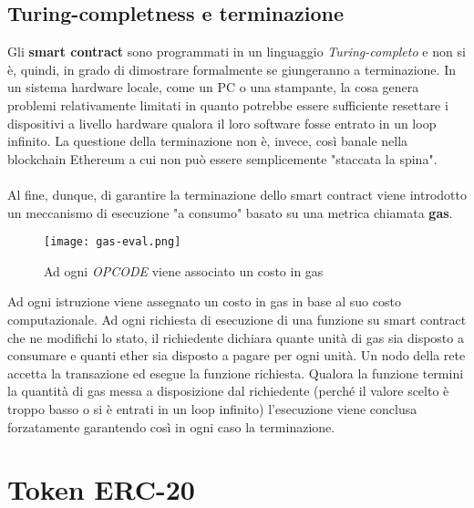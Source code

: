     \subsection{Turing-completness e terminazione}
    \label{contesto:ethereum:terminazione}
    Gli \textbf{smart contract} sono programmati in un linguaggio \textit{Turing-completo} e non si è, quindi, in grado di dimostrare formalmente se giungeranno a terminazione. In un sistema hardware locale, come un PC o una stampante, la cosa genera problemi relativamente limitati in quanto potrebbe essere sufficiente resettare i dispositivi a livello hardware qualora il loro software fosse entrato in un loop infinito. La questione della terminazione non è, invece, così banale nella blockchain Ethereum a cui non può essere semplicemente "staccata la spina".
    \\\\
    Al fine, dunque, di garantire la terminazione dello smart contract viene introdotto un meccanismo di esecuzione "a consumo" basato su una metrica chiamata \textbf{gas}.

    \begin{figure}[h!]
        \centering
        \texttt{[image: gas-eval.png]}
        \caption{Ad ogni \textit{OPCODE} viene associato un costo in gas}
    \end{figure}

    Ad ogni istruzione viene assegnato un costo in gas in base al suo costo computazionale. Ad ogni richiesta di esecuzione di una funzione su smart contract che ne modifichi lo stato, il richiedente dichiara quante unità di gas sia disposto a consumare e quanti ether sia disposto a pagare per ogni unità. Un nodo della rete accetta la transazione ed esegue la funzione richiesta. Qualora la funzione termini la quantità di gas messa a disposizione dal richiedente (perché il valore scelto è troppo basso o si è entrati in un loop infinito) l'esecuzione viene conclusa forzatamente garantendo così in ogni caso la terminazione.

\section{Token ERC-20}
